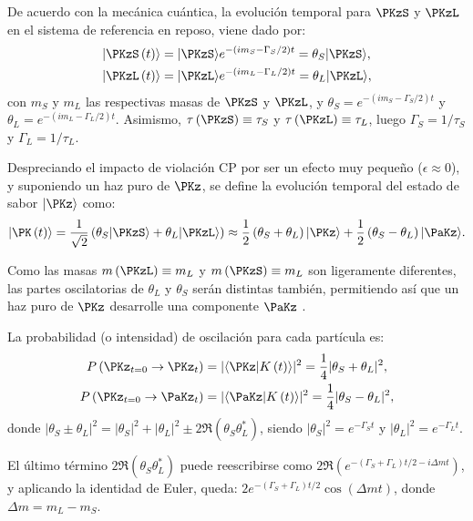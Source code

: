 De acuerdo con la mecánica cuántica, la evolución temporal para $\PKzS$ y $\PKzL$ en el sistema de referencia en reposo, viene dado por:
\begin{align}
|\PKzS\left(t\right)\rangle &= |\PKzS\rangle e^{-\left(im_{S}-\Gamma_{S}/2\right)t} = \theta_{S}|\PKzS\rangle , \\
|\PKzL\left(t\right)\rangle &= |\PKzL\rangle e^{-\left(im_{L}-\Gamma_{L}/2\right)t} = \theta_{L}|\PKzL\rangle , \label{eq:evtempKSKL}
\end{align}
con $m_{S}$ y $m_{L}$ las respectivas masas de $\PKzS$ y $\PKzL$, y $\theta_{S}=e^{-\left(im_{S}-\Gamma_{S}/2\right)t}$ y $\theta_{L}=e^{-\left(im_{L}-\Gamma_{L}/2\right)t}$. Asimismo, $\tau\left(\PKzS\right) \equiv \tau_S$ y $\tau\left(\PKzL\right) \equiv \tau_L$, luego $\Gamma_{S}=1/ \tau_S$ y $\Gamma_{L}=1/\tau_L$. 

Despreciando el impacto de violación CP por ser un efecto muy pequeño ($\epsilon \approx 0$), y suponiendo un haz puro de $\PKz$, se define la evolución temporal del estado de sabor $|\PKz\rangle$ como:
\begin{equation}
|\PK\left(t\right)\rangle=\dfrac{1}{\sqrt{2}}\left(\theta_{S}|\PKzS\rangle + \theta_{L}|\PKzL\rangle \right) \approx \dfrac{1}{2}\left(\theta_{S}+\theta_{L}\right)|\PKz\rangle + \dfrac{1}{2}\left(\theta_{S}-\theta_{L}\right)|\PaKz\rangle .
\end{equation}

Como las masas $m\left(\PKzL\right) \equiv m_{L}$ y $m\left(\PKzS\right) \equiv m_{L}$ son ligeramente diferentes, las partes oscilatorias de $\theta_{L}$ y $\theta_{S}$ serán distintas también, permitiendo así que un haz puro de $\PKz$ desarrolle una componente $\PaKz$ \cite{Thomson}.

La probabilidad (o intensidad) de oscilación para cada partícula es:
\begin{align}
P\left(\PKz_{t=0} \rightarrow \PKz_{t}\right)&= |\langle\PKz|K\left(t\right)\rangle|^2 =\dfrac{1}{4}|\theta_{S}+\theta_{L}|^2 ,\label{eq:prob1osci}\\
P\left(\PKz_{t=0} \rightarrow \PaKz_{t}\right)&= |\langle\PaKz|K\left(t\right)\rangle|^2 =\dfrac{1}{4}|\theta_{S}-\theta_{L}|^2 ,\label{eq:prob2osci}
\end{align}
donde $|\theta_{S} \pm \theta_{L}|^2=|\theta_{S}|^2+|\theta_{L}|^2 \pm 2\Re\left(\theta_{S}\theta_{L}^{\ast}\right)$, siendo $|\theta_{S}|^2=e^{-\Gamma_{S} t}$ y $|\theta_{L}|^2=e^{-\Gamma_{L} t}$. 

El último término $2\Re\left(\theta_{S}\theta_{L}^{\ast}\right)$ puede reescribirse como $2\Re\left(e^{-\left(\Gamma_{S}+\Gamma_{L}\right)t/2-i\Delta mt}\right)$, y aplicando la identidad de Euler, queda: $2e^{-\left(\Gamma_{S}+\Gamma_{L}\right)t/2} \cos \left(\Delta mt\right)$, donde $\Delta m = m_{L}-m_{S}$.

